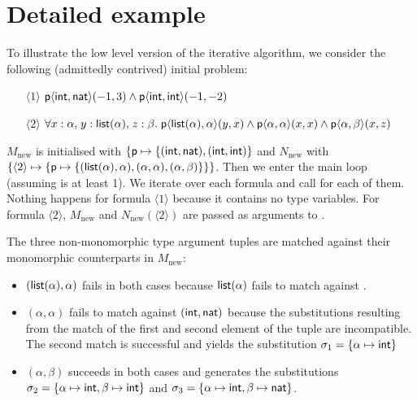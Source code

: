 \documentclass[runningheads]{llncs}
\begin{document}
\section{Detailed example}

To illustrate the low level version of the iterative algorithm, we consider the following (admittedly contrived) initial problem:
\begin{itemize}
   \item[\(\langle1\rangle\)] \(\textsf{p}\langle \textsf{int}, \textsf{nat}\rangle(-1, 3) \land \textsf{p}\langle \textsf{int}, \textsf{int}\rangle(-1, -2)\)
   \item[\(\langle 2\rangle\)] \(\forall x: \alpha{,}\; y:\textsf{list}(\alpha){,}\; z: \beta{.}\; \textsf{p}\langle \textsf{list}(\alpha), \alpha\rangle(y, x) \land \textsf{p}\langle \alpha, \alpha \rangle(x, x) \land \textsf{p}\langle \alpha, \beta\rangle(x, z)\)
\end{itemize}
%
\(M_{\text{new}}\) is initialised with \(\{\textsf{p}\mapsto \{(\textsf{int}, \textsf{nat}), (\textsf{int}, \textsf{int})\}\) and \(N_{\text{new}}\) with \(\{\langle 2\rangle\mapsto \{\textsf{p}\mapsto \{(\textsf{list}(\alpha), \alpha), (\alpha, \alpha), (\alpha, \beta)\}\}\}\). Then we enter the main loop (assuming \Loop is at least 1). We iterate over each formula and call \FStep for each of them. Nothing happens for formula \(\langle1\rangle\) because it contains no type variables. For formula \(\langle2\rangle\), \(M_{\text{new}}\) and \(N_{\text{new}}(\langle2\rangle)\) are passed as arguments to \SubstGen.

The three non-monomorphic type argument tuples are matched against their monomorphic counterparts in \(M_{\text{new}}\):
\begin{itemize}
   \item \((\textsf{list}(\alpha), \alpha)\) fails in both cases because \(\textsf{list}(\alpha)\) fails to match against .
   \item \((\alpha, \alpha)\) fails to match against \((\textsf{int}, \textsf{nat})\) because the substitutions resulting from the match of the first and second element of the tuple are incompatible. The second match is successful and yields the substitution \(\sigma_1 = \{\alpha \mapsto \textsf{int}\}\)
   \item \((\alpha, \beta)\) succeeds in both cases and generates the substitutions \(\sigma_2 = \{\alpha \mapsto \textsf{int}, \beta \mapsto \textsf{int}\}\) and \(\sigma_3 = \{\alpha \mapsto \textsf{int}, \beta \mapsto \textsf{nat}\}\).
\end{itemize}
\end{document}
